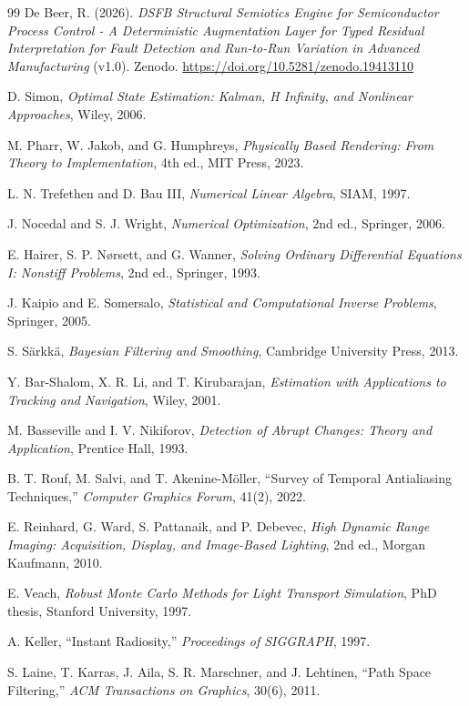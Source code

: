 \documentclass[11pt,letterpaper]{article}
\theoremstyle{gcresult}
\theoremstyle{definition}
\begin{document}
\begin{thebibliography}{99}
De Beer, R. (2026).
\textit{DSFB Structural Semiotics Engine for Semiconductor Process Control - A Deterministic Augmentation Layer for Typed Residual Interpretation for Fault Detection and Run-to-Run Variation in Advanced Manufacturing} (v1.0). Zenodo. \url{https://doi.org/10.5281/zenodo.19413110}


D. Simon,
\emph{Optimal State Estimation: Kalman, H Infinity, and Nonlinear Approaches},
Wiley, 2006.

M. Pharr, W. Jakob, and G. Humphreys,
\emph{Physically Based Rendering: From Theory to Implementation},
4th ed., MIT Press, 2023.

L. N. Trefethen and D. Bau III,
\emph{Numerical Linear Algebra},
SIAM, 1997.

J. Nocedal and S. J. Wright,
\emph{Numerical Optimization},
2nd ed., Springer, 2006.

E. Hairer, S. P. N\o rsett, and G. Wanner,
\emph{Solving Ordinary Differential Equations I: Nonstiff Problems},
2nd ed., Springer, 1993.

J. Kaipio and E. Somersalo,
\emph{Statistical and Computational Inverse Problems},
Springer, 2005.

S. S\"arkk\"a,
\emph{Bayesian Filtering and Smoothing},
Cambridge University Press, 2013.

Y. Bar-Shalom, X. R. Li, and T. Kirubarajan,
\emph{Estimation with Applications to Tracking and Navigation},
Wiley, 2001.

M. Basseville and I. V. Nikiforov,
\emph{Detection of Abrupt Changes: Theory and Application},
Prentice Hall, 1993.

B. T. Rouf, M. Salvi, and T. Akenine-M\"oller,
``Survey of Temporal Antialiasing Techniques,''
\emph{Computer Graphics Forum}, 41(2), 2022.

E. Reinhard, G. Ward, S. Pattanaik, and P. Debevec,
\emph{High Dynamic Range Imaging: Acquisition, Display, and Image-Based Lighting},
2nd ed., Morgan Kaufmann, 2010.

E. Veach,
\emph{Robust Monte Carlo Methods for Light Transport Simulation},
PhD thesis, Stanford University, 1997.

A. Keller,
``Instant Radiosity,''
\emph{Proceedings of SIGGRAPH}, 1997.

S. Laine, T. Karras, J. Aila, S. R. Marschner, and J. Lehtinen,
``Path Space Filtering,''
\emph{ACM Transactions on Graphics}, 30(6), 2011.


\end{thebibliography}
\end{document}
